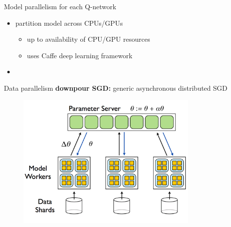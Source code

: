 \begin{frame}{Model parallelism}
    for each Q-network
    \vspace*{0.5em}
    \begin{itemize}\itemsep=12pt

        \item partition model across CPUs/GPUs
        \vspace*{0.5em}
        \begin{itemize}
            \item up to availability of CPU/GPU resources
            \item uses Caffe deep learning framework
        \end{itemize}

        \item {}

    \end{itemize}
\end{frame}

\begin{frame}{Data parallelism}
    \textbf{downpour SGD:} generic asynchronous distributed SGD
    \begin{figure}
        \centering
        \includegraphics[width=0.8\textwidth]{data-par.pdf}
    \end{figure}
\end{frame}

